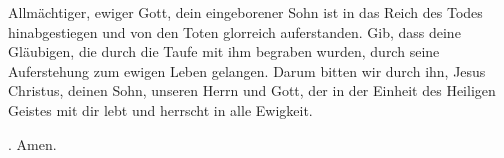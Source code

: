 \lettrine[lines=3]{A}{}llmächtiger, ewiger Gott, dein eingeborener Sohn ist in das Reich des Todes hinabgestiegen und von den Toten glorreich auferstanden. Gib, dass deine Gläubigen, die durch die Taufe mit ihm begraben wurden, durch seine Auferstehung zum ewigen Leben gelangen. Darum bitten wir durch ihn, Jesus Christus, deinen Sohn, unseren Herrn und Gott, der in der Einheit des Heiligen Geistes mit dir lebt und herrscht in alle Ewigkeit.
\par \Rbar. Amen.